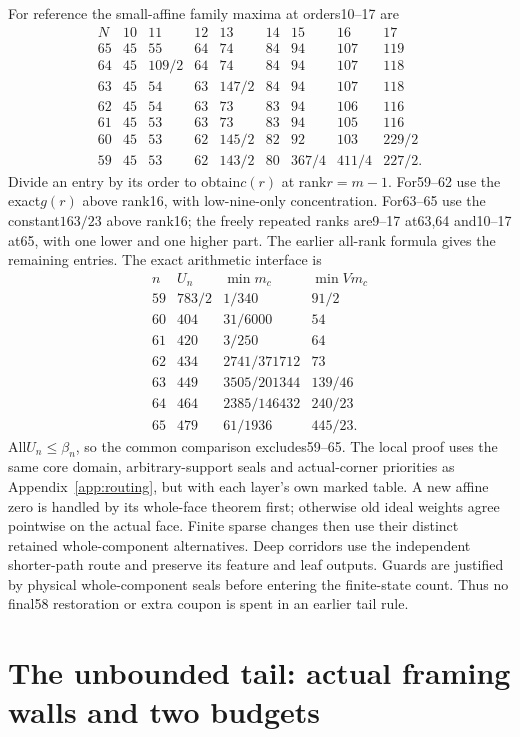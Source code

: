 \documentclass[11pt]{article}
\theoremstyle{remark}\newtheorem{remark}[theorem]{Remark}
\begin{document}
For reference the small-affine family maxima at orders10--17 are
\[
\begin{array}{c|rrrrrrrr}
N&10&11&12&13&14&15&16&17\\\hline
65&45&55&64&74&84&94&107&119\\
64&45&109/2&64&74&84&94&107&118\\
63&45&54&63&147/2&84&94&107&118\\
62&45&54&63&73&83&94&106&116\\
61&45&53&63&73&83&94&105&116\\
60&45&53&62&145/2&82&92&103&229/2\\
59&45&53&62&143/2&80&367/4&411/4&227/2 .
\end{array}
\]
Divide an entry by its order to obtain$c(r)$ at rank$r=m-1$.
For59--62 use the exact$g(r)$ above rank16, with low-nine-only
concentration. For63--65 use the constant$163/23$ above rank16;
the freely repeated ranks are9--17 at63,64 and10--17 at65,
with one lower and one higher part. The earlier all-rank formula
gives the remaining entries.
The exact arithmetic interface is
\[
\begin{array}{c|r|c|c}
n&U_n&\min m_c&\min V m_c\\\hline
59&783/2&1/340&91/2\\
60&404&31/6000&54\\
61&420&3/250&64\\
62&434&2741/371712&73\\
63&449&3505/201344&139/46\\
64&464&2385/146432&240/23\\
65&479&61/1936&445/23 .
\end{array}
\]
All$U_n\le\beta_n$, so the common comparison excludes59--65.
The local proof uses the same core domain, arbitrary-support seals
and actual-corner priorities as Appendix~\ref{app:routing}, but with
each layer's own marked table. A new affine zero is handled by its
whole-face theorem first; otherwise old ideal weights agree
pointwise on the actual face. Finite sparse changes then use their
distinct retained whole-component alternatives. Deep corridors use
the independent shorter-path route and preserve its feature and leaf
outputs. Guards are justified by physical whole-component seals
before entering the finite-state count. Thus no final58 restoration
or extra coupon is spent in an earlier tail rule.

\section{The unbounded tail: actual framing walls and two budgets}
\label{app:narrow-tail}
\end{document}
